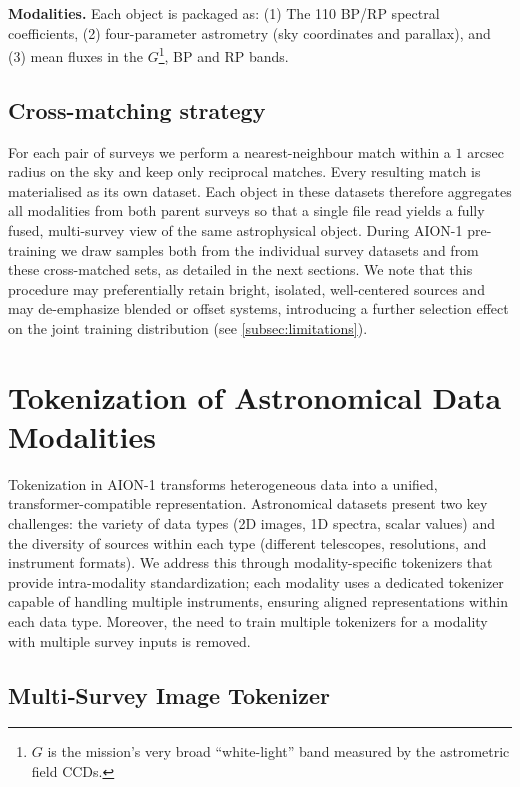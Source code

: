 \documentclass[]{polymathic}
\begin{document}
\textbf{Modalities.}  Each object is packaged as:
(1) The 110 BP/RP spectral coefficients, 
(2) four-parameter astrometry (sky coordinates and parallax), and (3) mean fluxes in the $G$\footnote{$G$ is the mission’s very broad “white-light” band measured by the astrometric field CCDs.}, BP and RP bands.

\subsection{Cross-matching strategy}  
For each pair of surveys we perform a nearest-neighbour match within a $1$ arcsec radius on the sky and keep only reciprocal matches. Every resulting match is materialised as its own dataset. Each object in these datasets therefore aggregates all modalities from both parent surveys so that a single file read yields a fully fused, multi-survey view of the same astrophysical object. During AION-1 pre-training we draw samples both from the individual survey datasets and from these cross-matched sets, as detailed in the next sections. We note that this procedure may preferentially retain bright, isolated, well-centered sources and may de-emphasize blended or offset systems, introducing a further selection effect on the joint training distribution (see \cref{subsec:limitations}).


\section{Tokenization of Astronomical Data Modalities}

Tokenization in AION-1 transforms heterogeneous data into a unified, transformer-compatible representation. Astronomical datasets present two key challenges: the variety of data types (2D images, 1D spectra, scalar values) and the diversity of sources within each type (different telescopes, resolutions, and instrument formats). We address this through modality-specific tokenizers that provide intra-modality standardization; each modality uses a dedicated tokenizer capable of handling multiple instruments, ensuring aligned representations within each data type. Moreover, the need to train multiple tokenizers for a modality with multiple survey inputs is removed.


\subsection{Multi‑Survey Image Tokenizer}
\label{sec:image_tokenizer}
\end{document}
